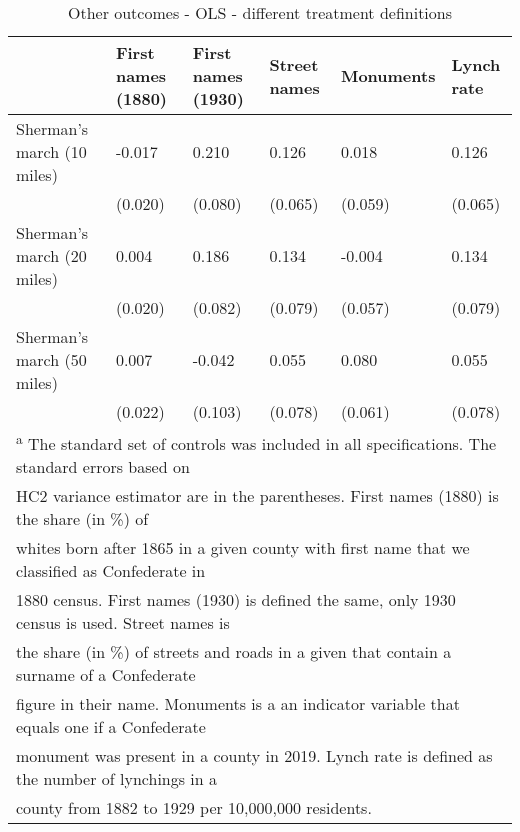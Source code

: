 \begin{table}[!h]

\caption{\label{tab:other_out_ols_diff_treat_def}Other outcomes - OLS - different treatment definitions}
\centering
\begin{tabular}[t]{llllll}
\toprule
 & First names (1880) & First names (1930) & Street names & Monuments & Lynch rate\\
\midrule
Sherman's march (10 miles) & -0.017 & 0.210 & 0.126 & 0.018 & 0.126\\
 & (0.020) & (0.080) & (0.065) & (0.059) & (0.065)\\
Sherman's march (20 miles) & 0.004 & 0.186 & 0.134 & -0.004 & 0.134\\
 & (0.020) & (0.082) & (0.079) & (0.057) & (0.079)\\
Sherman's march (50 miles) & 0.007 & -0.042 & 0.055 & 0.080 & 0.055\\
 & (0.022) & (0.103) & (0.078) & (0.061) & (0.078)\\
\bottomrule
\multicolumn{6}{l}{\textsuperscript{a} The standard set of controls was included in all specifications. The standard errors based on}\\
\multicolumn{6}{l}{HC2 variance estimator are in the parentheses. First names (1880) is the share (in \%) of}\\
\multicolumn{6}{l}{whites born after 1865 in a given county with first name that we classified as Confederate in}\\
\multicolumn{6}{l}{1880 census. First names (1930) is defined the same, only 1930 census is used. Street names is}\\
\multicolumn{6}{l}{the share (in \%) of streets and roads in a given that contain a surname of a Confederate}\\
\multicolumn{6}{l}{figure in their name. Monuments is a an indicator variable that equals one if a Confederate}\\
\multicolumn{6}{l}{monument was present in a county in 2019. Lynch rate is defined as the number of lynchings in a}\\
\multicolumn{6}{l}{county from 1882 to 1929 per 10,000,000 residents.}\\
\end{tabular}
\end{table}
